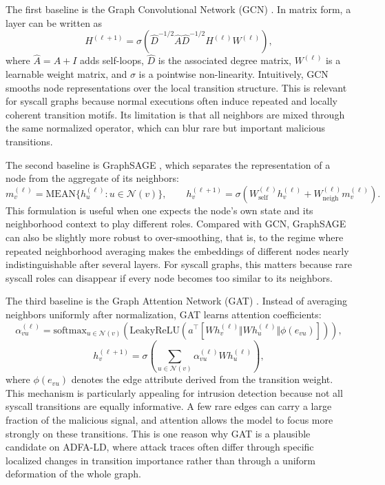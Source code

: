 \documentclass{article}
\begin{document}
The first baseline is the Graph Convolutional Network (GCN) \cite{gcn}. In matrix form, a layer can be written as
\[
H^{(\ell+1)} = \sigma\!\left(\hat{D}^{-1/2}\hat{A}\hat{D}^{-1/2} H^{(\ell)} W^{(\ell)}\right),
\]
where $\hat{A}=A+I$ adds self-loops, $\hat{D}$ is the associated degree matrix, $W^{(\ell)}$ is a learnable weight matrix, and $\sigma$ is a pointwise non-linearity. Intuitively, GCN smooths node representations over the local transition structure. This is relevant for syscall graphs because normal executions often induce repeated and locally coherent transition motifs. Its limitation is that all neighbors are mixed through the same normalized operator, which can blur rare but important malicious transitions.

The second baseline is GraphSAGE \cite{graphsage}, which separates the representation of a node from the aggregate of its neighbors:
\[
m_v^{(\ell)} = \mathrm{MEAN}\{h_u^{(\ell)} : u \in \mathcal{N}(v)\}, \qquad
h_v^{(\ell+1)} = \sigma\!\left(W_{\mathrm{self}}^{(\ell)} h_v^{(\ell)} + W_{\mathrm{neigh}}^{(\ell)} m_v^{(\ell)}\right).
\]
This formulation is useful when one expects the node's own state and its neighborhood context to play different roles. Compared with GCN, GraphSAGE can also be slightly more robust to over-smoothing, that is, to the regime where repeated neighborhood averaging makes the embeddings of different nodes nearly indistinguishable after several layers. For syscall graphs, this matters because rare syscall roles can disappear if every node becomes too similar to its neighbors.

The third baseline is the Graph Attention Network (GAT) \cite{gat}. Instead of averaging neighbors uniformly after normalization, GAT learns attention coefficients:
\[
\alpha_{vu}^{(\ell)} = \mathrm{softmax}_{u \in \mathcal{N}(v)}\left(
\mathrm{LeakyReLU}\!\left(a^{\top}[W h_v^{(\ell)} \Vert W h_u^{(\ell)} \Vert \phi(e_{vu})]\right)
\right),
\]
\[
h_v^{(\ell+1)} = \sigma\!\left(\sum_{u \in \mathcal{N}(v)} \alpha_{vu}^{(\ell)} W h_u^{(\ell)}\right),
\]
where $\phi(e_{vu})$ denotes the edge attribute derived from the transition weight. This mechanism is particularly appealing for intrusion detection because not all syscall transitions are equally informative. A few rare edges can carry a large fraction of the malicious signal, and attention allows the model to focus more strongly on these transitions. This is one reason why GAT is a plausible candidate on ADFA-LD, where attack traces often differ through specific localized changes in transition importance rather than through a uniform deformation of the whole graph.
\end{document}
